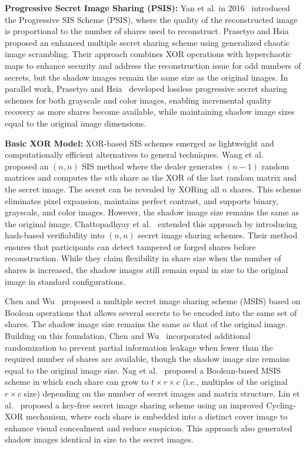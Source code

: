 \textbf{Progressive Secret Image Sharing (PSIS):} Yan et al. in 2016~\cite{yan2016} introduced the Progressive SIS Scheme (PSIS), where the quality of the reconstructed image is proportional to the number of shares used to reconstruct. Prasetyo and Hsia~\cite{prasetyo2019improved} proposed an enhanced multiple secret sharing scheme using generalized chaotic image scrambling. Their approach combines XOR operations with hyperchaotic maps to enhance security and address the reconstruction issue for odd numbers of secrets, but the shadow images remain the same size as the original images. In parallel work, Prasetyo and Hsia~\cite{prasetyo2019lossless} developed lossless progressive secret sharing schemes for both grayscale and color images, enabling incremental quality recovery as more shares become available, while maintaining shadow image sizes equal to the original image dimensions.
 
\textbf{Basic XOR Model:} XOR-based SIS schemes emerged as lightweight and computationally efficient alternatives to general techniques. Wang et al.~\cite{wang2007} proposed an $(n, n)$ SIS method where the dealer generates $(n - 1)$ random matrices and computes the $n$th share as the XOR of the last random matrix and the secret image. The secret can be revealed by XORing all $n$ shares. This scheme eliminates pixel expansion, maintains perfect contrast, and supports binary, grayscale, and color images. However, the shadow image size remains the same as the original image. Chattopadhyay et al.~\cite{chattopadhyay2018} extended this approach by introducing hash-based verifiability into $(n, n)$ secret image sharing schemes. Their method ensures that participants can detect tampered or forged shares before reconstruction. While they claim flexibility in share size when the number of shares is increased, the shadow images still remain equal in size to the original image in standard configurations.
 
Chen and Wu~\cite{chen2011} proposed a multiple secret image sharing scheme (MSIS) based on Boolean operations that allows several secrets to be encoded into the same set of shares. The shadow image size remains the same as that of the original image. Building on this foundation, Chen and Wu~\cite{chen2014} incorporated additional randomization to prevent partial information leakage when fewer than the required number of shares are available, though the shadow image size remains equal to the original image size. Nag et al.~\cite{nag2020} proposed a Boolean-based MSIS scheme in which each share can grow to $t \times r \times c$ (i.e., multiples of the original $r \times c$ size) depending on the number of secret images and matrix structure. Lin et al.~\cite{lin2024} proposed a key-free secret image sharing scheme using an improved Cycling-XOR mechanism, where each share is embedded into a distinct cover image to enhance visual concealment and reduce suspicion. This approach also generated shadow images identical in size to the secret images.
 
